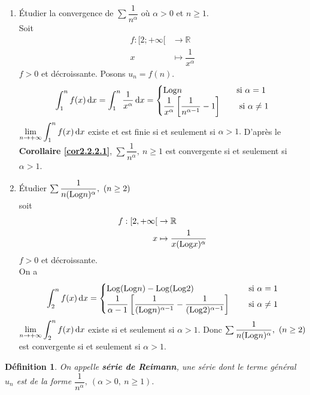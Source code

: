 \documentclass[11pt, a4paper]{book}
\newtheorem{defi}{D\'efinition}[section]
\begin{document}
\begin{enumerate}
\item \'Etudier la convergence de $\sum \dfrac{1}{n^\alpha}$ o\`u $\alpha >0$ et $n\geq1$.\\ Soit \begin{align*} f:[2;+\infty[&\rightarrow \mathbb{R}\\  x&\mapsto \dfrac{1}{x^\alpha} \end{align*} $f>0$ et d\'ecroissante. 
Posons $u_n=f(n)$. $$ \int_1^n f(x)\,\mathrm{d} x=\int_1^n \dfrac{1}{x^\alpha}\,\mathrm{d} x= \begin{cases} \mathrm{Log} n &\quad \text{si} ~\alpha=1\\ \dfrac{1}{x^\alpha}\left[\dfrac{1}{n^{\alpha-1}}-1\right] &\quad\text{ si}~ \alpha \neq 1 \end{cases}$$ 
${\displaystyle \lim_{n\rightarrow+\infty} \int_1^n f(x)\,\mathrm{d} x }$ existe et est finie si et seulement si $\alpha >1.$ D'apr\`es le \textbf{Corollaire \ref{cor2.2.2.1}}, $\sum \dfrac{1}{n^\alpha},~ n\geq1$ est convergente si et seulement si $\alpha>1.$
\item \'Etudier $\sum \dfrac{1}{n (\mathrm{Log} n)^\alpha},~(n\geq 2)$\\
soit \begin{align*} f:[2,+\infty[& \rightarrow \mathbb{R}\\ x&\mapsto \dfrac{1}{x(\mathrm{Log} x)^\alpha}\end{align*} $f>0$ et d\'ecroissante. \\ On a $$ \int_2^n f(x)\,\mathrm{d} x= \begin{cases} \mathrm{Log}(\mathrm{Log} n)-\mathrm{Log}(\mathrm{Log}2)~&\quad \text{si} ~\alpha=1\\ \dfrac{1}{\alpha -1}\left[\dfrac{1}{(\mathrm{Log} n)^{\alpha -1}}-\dfrac{1}{(\mathrm{Log} 2)^{\alpha -1}}\right]~&\quad \text{si}~ \alpha\neq 1\end{cases}$$  ${\displaystyle  \lim_{n\rightarrow+\infty}\int_2^n f(x)\,\mathrm{d} x} $ existe si et seulement si $\alpha>1$. Donc $\sum \dfrac{1}{n (\mathrm{Log} n)^\alpha},~(n\geq 2)$ est convergente si et seulement si $\alpha >1.$
\end{enumerate}
\begin{defi} On appelle \textbf{s\'erie de Reimann}, une s\'erie dont le terme g\'en\'eral $u_n$ est de la forme $\dfrac{1}{n^\alpha},~(\alpha>0,~n\geq 1).$ \end{defi}
\end{document}
